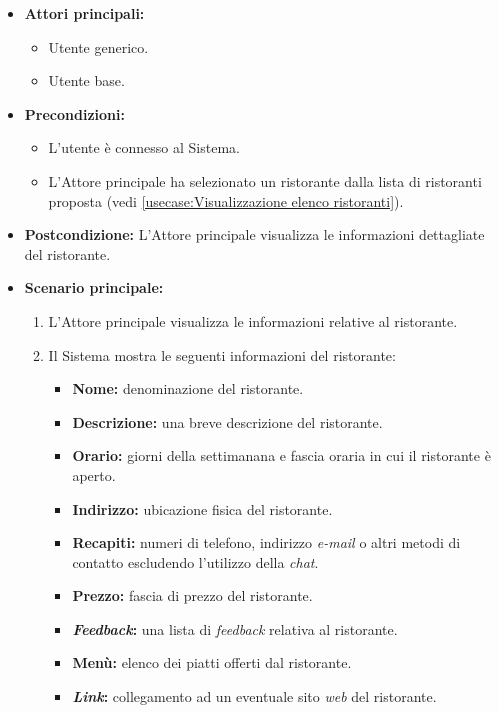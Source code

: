 \begin{itemize}

	\item \textbf{Attori principali:} 
	\begin{itemize}
		\item Utente generico.
		\item Utente base.
	\end{itemize}

	\item \textbf{Precondizioni:}
	\begin{itemize}
        \item L'utente è connesso al Sistema.
        \item L'Attore principale ha selezionato un ristorante dalla lista di ristoranti proposta (vedi \autoref{usecase:Visualizzazione elenco ristoranti}).
    \end{itemize}

	\item \textbf{Postcondizione:} L'Attore principale visualizza le informazioni dettagliate del ristorante.

	\item \textbf{Scenario principale:}
		\begin{enumerate}
		    \item L'Attore principale visualizza le informazioni relative al ristorante.
		    \item Il Sistema mostra le seguenti informazioni del ristorante:
		    \begin{itemize}
				\item \textbf{Nome:} denominazione del ristorante.
				\item \textbf{Descrizione:} una breve descrizione del ristorante.
				\item \textbf{Orario:} giorni della settimanana e fascia oraria in cui il ristorante è aperto.
				\item \textbf{Indirizzo:} ubicazione fisica del ristorante.
				\item \textbf{Recapiti:} numeri di telefono, indirizzo \textit{e-mail} o altri metodi di contatto escludendo l'utilizzo della \textit{chat}.
				\item \textbf{Prezzo:} fascia di prezzo del ristorante.
				\item \textbf{\textit{Feedback}:} una lista di \textit{feedback} relativa al ristorante.
				\item \textbf{Menù:} elenco dei piatti offerti dal ristorante.
				\item \textbf{\textit{Link}:} collegamento ad un eventuale sito \textit{web} del ristorante. 
			\end{itemize}
	    \end{enumerate}

\end{itemize}
